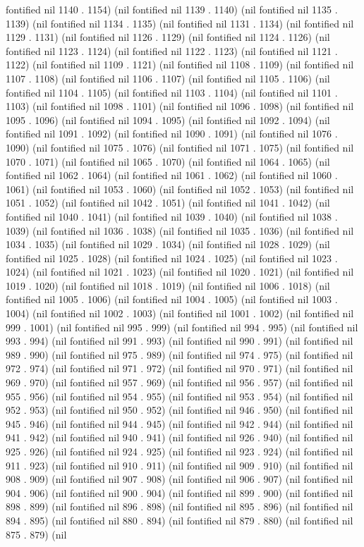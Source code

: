 fontified nil 1140 . 1154) (nil fontified nil 1139 . 1140) (nil fontified nil 1135 . 1139) (nil fontified nil 1134 . 1135) (nil fontified nil 1131 . 1134) (nil fontified nil 1129 . 1131) (nil fontified nil 1126 . 1129) (nil fontified nil 1124 . 1126) (nil fontified nil 1123 . 1124) (nil fontified nil 1122 . 1123) (nil fontified nil 1121 . 1122) (nil fontified nil 1109 . 1121) (nil fontified nil 1108 . 1109) (nil fontified nil 1107 . 1108) (nil fontified nil 1106 . 1107) (nil fontified nil 1105 . 1106) (nil fontified nil 1104 . 1105) (nil fontified nil 1103 . 1104) (nil fontified nil 1101 . 1103) (nil fontified nil 1098 . 1101) (nil fontified nil 1096 . 1098) (nil fontified nil 1095 . 1096) (nil fontified nil 1094 . 1095) (nil fontified nil 1092 . 1094) (nil fontified nil 1091 . 1092) (nil fontified nil 1090 . 1091) (nil fontified nil 1076 . 1090) (nil fontified nil 1075 . 1076) (nil fontified nil 1071 . 1075) (nil fontified nil 1070 . 1071) (nil fontified nil 1065 . 1070) (nil fontified nil 1064 . 1065) (nil fontified nil 1062 . 1064) (nil fontified nil 1061 . 1062) (nil fontified nil 1060 . 1061) (nil fontified nil 1053 . 1060) (nil fontified nil 1052 . 1053) (nil fontified nil 1051 . 1052) (nil fontified nil 1042 . 1051) (nil fontified nil 1041 . 1042) (nil fontified nil 1040 . 1041) (nil fontified nil 1039 . 1040) (nil fontified nil 1038 . 1039) (nil fontified nil 1036 . 1038) (nil fontified nil 1035 . 1036) (nil fontified nil 1034 . 1035) (nil fontified nil 1029 . 1034) (nil fontified nil 1028 . 1029) (nil fontified nil 1025 . 1028) (nil fontified nil 1024 . 1025) (nil fontified nil 1023 . 1024) (nil fontified nil 1021 . 1023) (nil fontified nil 1020 . 1021) (nil fontified nil 1019 . 1020) (nil fontified nil 1018 . 1019) (nil fontified nil 1006 . 1018) (nil fontified nil 1005 . 1006) (nil fontified nil 1004 . 1005) (nil fontified nil 1003 . 1004) (nil fontified nil 1002 . 1003) (nil fontified nil 1001 . 1002) (nil fontified nil 999 . 1001) (nil fontified nil 995 . 999) (nil fontified nil 994 . 995) (nil fontified nil 993 . 994) (nil fontified nil 991 . 993) (nil fontified nil 990 . 991) (nil fontified nil 989 . 990) (nil fontified nil 975 . 989) (nil fontified nil 974 . 975) (nil fontified nil 972 . 974) (nil fontified nil 971 . 972) (nil fontified nil 970 . 971) (nil fontified nil 969 . 970) (nil fontified nil 957 . 969) (nil fontified nil 956 . 957) (nil fontified nil 955 . 956) (nil fontified nil 954 . 955) (nil fontified nil 953 . 954) (nil fontified nil 952 . 953) (nil fontified nil 950 . 952) (nil fontified nil 946 . 950) (nil fontified nil 945 . 946) (nil fontified nil 944 . 945) (nil fontified nil 942 . 944) (nil fontified nil 941 . 942) (nil fontified nil 940 . 941) (nil fontified nil 926 . 940) (nil fontified nil 925 . 926) (nil fontified nil 924 . 925) (nil fontified nil 923 . 924) (nil fontified nil 911 . 923) (nil fontified nil 910 . 911) (nil fontified nil 909 . 910) (nil fontified nil 908 . 909) (nil fontified nil 907 . 908) (nil fontified nil 906 . 907) (nil fontified nil 904 . 906) (nil fontified nil 900 . 904) (nil fontified nil 899 . 900) (nil fontified nil 898 . 899) (nil fontified nil 896 . 898) (nil fontified nil 895 . 896) (nil fontified nil 894 . 895) (nil fontified nil 880 . 894) (nil fontified nil 879 . 880) (nil fontified nil 875 . 879) (nil 
